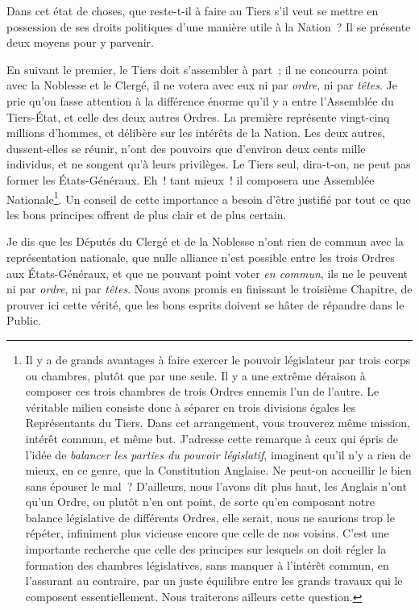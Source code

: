 \documentclass[french,twoside]{book} %
\begin{document}
Dans cet état de choses, que reste-t-il à faire au Tiers s’il veut se mettre en possession de ses droits politiques d’une manière utile à la Nation ? Il se présente deux moyens pour y parvenir.\par
En suivant le premier, le Tiers doit s’assembler à part ; il ne concourra point avec la Noblesse et le Clergé, il ne votera avec eux ni par {\itshape ordre}, ni par {\itshape têtes}. Je prie qu’on fasse attention à la différence énorme qu’il y a entre l’Assemblée du Tiers-État, et celle des deux autres Ordres. La première représente vingt-cinq millions d’hommes, et délibère sur les intérêts de la Nation. Les deux autres, dussent-elles se réunir, n’ont des pouvoirs que d’environ deux cents mille individus, et ne songent qu’à leurs privilèges. Le Tiers seul, dira-t-on, ne peut pas former les États-Généraux. Eh ! tant mieux ! il composera une Assemblée Nationale\footnote{Il y a de grands avantages à faire exercer le pouvoir législateur par trois corps ou chambres, plutôt que par une seule. Il y a une extrême déraison à composer ces trois chambres de trois Ordres ennemis l’un de l’autre. Le véritable milieu consiste donc à séparer en trois divisions égales les Représentants du Tiers. Dans cet arrangement, vous trouverez même mission, intérêt commun, et même but. J’adresse cette remarque à ceux qui épris de l’idée de {\itshape balancer les parties du pouvoir législatif}, imaginent qu’il n’y a rien de mieux, en ce genre, que la Constitution Anglaise. Ne peut-on accueillir le bien sans épouser le mal ? D’ailleurs, nous l’avons dit plus haut, les Anglais n’ont qu’un Ordre, ou plutôt n’en ont point, de sorte qu’en composant notre balance législative de différents Ordres, elle serait, nous ne saurions trop le répéter, infiniment plus vicieuse encore que celle de nos voisins. C’est une importante recherche que celle des principes sur lesquels on doit régler la formation des chambres législatives, sans manquer à l’intérêt commun, en l’assurant au contraire, par un juste équilibre entre les grands travaux qui le composent essentiellement. Nous traiterons ailleurs cette question.}. Un conseil de cette importance a besoin d’être justifié par tout ce que les bons principes offrent de plus clair et de plus certain.\par
Je dis que les Députés du Clergé et de la Noblesse n’ont rien de commun avec la représentation nationale, que nulle alliance n’est possible entre les trois Ordres aux États-Généraux, et que ne pouvant point voter {\itshape en commun}, ils ne le peuvent ni par {\itshape ordre}, ni par {\itshape têtes}. Nous avons promis en finissant le troisième Chapitre, de prouver ici cette vérité, que les bons esprits doivent se hâter de répandre dans le Public.\par
\end{document}
